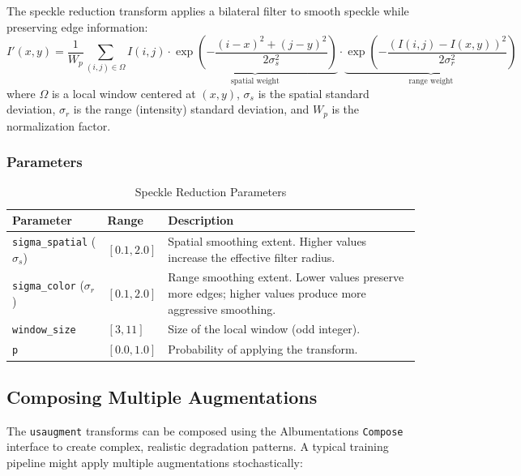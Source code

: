 \documentclass{article}
\theoremstyle{plain}
\theoremstyle{definition}
\theoremstyle{remark}
\begin{document}
The speckle reduction transform applies a bilateral filter to smooth speckle while preserving edge information:
\begin{equation}
    I'(x, y) = \frac{1}{W_p} \sum_{(i,j) \in \Omega} I(i, j) \cdot \underbrace{\exp\left(-\frac{(i-x)^2 + (j-y)^2}{2\sigma_s^2}\right)}_{\text{spatial weight}} \cdot \underbrace{\exp\left(-\frac{(I(i,j) - I(x,y))^2}{2\sigma_r^2}\right)}_{\text{range weight}}
\end{equation}
where $\Omega$ is a local window centered at $(x, y)$, $\sigma_s$ is the spatial standard deviation, $\sigma_r$ is the range (intensity) standard deviation, and $W_p$ is the normalization factor.

\subsubsection{Parameters}

\begin{table}[h]
\centering
\caption{Speckle Reduction Parameters}
\label{tab:speckle_reduction_params}
\begin{tabular}{@{}llp{6.5cm}@{}}
\toprule
\textbf{Parameter} & \textbf{Range} & \textbf{Description} \\
\midrule
\texttt{sigma\_spatial} ($\sigma_s$) & $[0.1, 2.0]$ & Spatial smoothing extent. Higher values increase the effective filter radius. \\
\texttt{sigma\_color} ($\sigma_r$) & $[0.1, 2.0]$ & Range smoothing extent. Lower values preserve more edges; higher values produce more aggressive smoothing. \\
\texttt{window\_size} & $[3, 11]$ & Size of the local window (odd integer). \\
\texttt{p} & $[0.0, 1.0]$ & Probability of applying the transform. \\
\bottomrule
\end{tabular}
\end{table}

\subsection{Composing Multiple Augmentations}
\label{appendix:augmentation_composition}

The \texttt{usaugment} transforms can be composed using the Albumentations \texttt{Compose} interface to create complex, realistic degradation patterns. A typical training pipeline might apply multiple augmentations stochastically:
\end{document}
